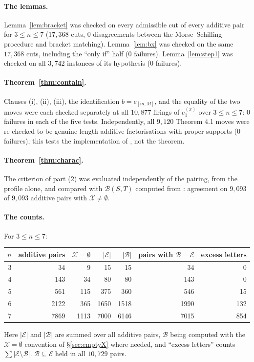 \documentclass[11pt]{article}
\theoremstyle{definition}
\newcommand{\et}{\tilde e_1}
\newcommand{\XX}{\mathcal{X}}
\newcommand{\EE}{\mathcal{E}}
\newcommand{\BB}{\mathcal{B}}
\begin{document}
\paragraph{The lemmas.} Lemma~\ref{lem:bracket} was checked on every admissible cut of every
additive pair for $3\le n\le7$ ($17{,}368$ cuts, $0$ disagreements between the Morse--Schilling
procedure and bracket matching). Lemma~\ref{lem:bx} was checked on the same $17{,}368$ cuts,
including the ``only if'' half ($0$ failures). Lemma~\ref{lem:step1} was checked on all $3{,}742$
instances of its hypothesis ($0$ failures).

\paragraph{Theorem~\ref{thm:contain}.} Clauses (i), (ii), (iii), the identification
$b=e_{[m,M]}$, and the equality of the two moves were each checked separately at all
$10{,}877$ firings of $\et^{(x)}$ over $3\le n\le7$: $0$ failures in each of the five tests.
Independently, all $9{,}120$ Theorem 4.1 moves were re-checked to be genuine length-additive
factorisations with proper supports ($0$ failures); this tests the implementation of
\cite[Thm.~4.1]{Clio2}, not the theorem.

\paragraph{Theorem~\ref{thm:charac}.} The criterion of part (2) was evaluated independently of
the pairing, from the profile alone, and compared with $\BB(S,T)$ computed from
\cite[Def.~\texttt{crystal operators}]{MS}: agreement on $9{,}093$ of $9{,}093$ additive pairs with $\XX\ne\emptyset$.

\paragraph{The counts.} For $3\le n\le7$:
\begin{center}
\begin{tabular}{rrrrrrr}
\hline
$n$ & additive pairs & $\XX=\emptyset$ & $|\EE|$ & $|\BB|$ & pairs with $\BB=\EE$ & excess letters \\
\hline
3 & 34   & 9    & 15   & 15   & 34   & 0 \\
4 & 143  & 34   & 80   & 80   & 143  & 0 \\
5 & 561  & 115  & 375  & 360  & 546  & 15 \\
6 & 2122 & 365  & 1650 & 1518 & 1990 & 132 \\
7 & 7869 & 1113 & 7000 & 6146 & 7015 & 854 \\
\hline
\end{tabular}
\end{center}
Here $|\EE|$ and $|\BB|$ are summed over all additive pairs, $\BB$ being computed with the
$\XX=\emptyset$ convention of \S\ref{sec:emptyX} where needed, and ``excess letters'' counts
$\sum|\EE\setminus\BB|$. $\BB\subseteq\EE$ held in all $10{,}729$ pairs.
\end{document}

